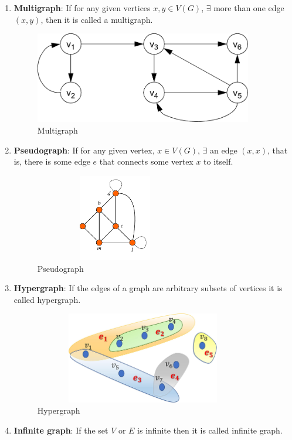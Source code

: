 \documentclass[../basic_graph_theory.tex]{subfiles}
\begin{document}
\begin{enumerate}
\begin{figure}[hbt!]
          \end{figure}
    \item \textbf{Multigraph}: If for any given vertices $x,y \in V(G)$, $\exists$ more than one edge $(x,y)$, then it is called a multigraph.
          \begin{figure}[hbt!]
              \centering
              \includegraphics[height=4cm, width=9.5cm]{../images/multi.png}
              \caption{Multigraph}
          \end{figure}
    \item \textbf{Pseudograph}: If for any given vertex, $x \in V(G)$, $\exists$ an edge $(x,x)$, that is, there is some edge $e$ that connects some vertex $x$ to itself.
          \begin{figure}[hbt!]
              \centering
              \includegraphics[height=3.82cm, width=7cm]{../images/pseudo.png}
              \caption{Pseudograph}
          \end{figure}
    \item \textbf{Hypergraph}: If the edges of a graph are arbitrary subsets of vertices it is called hypergraph.
          \begin{figure}[hbt!]
              \centering
              \includegraphics[height=4cm, width=9.5cm]{../images/hyper.jpg}
              \caption{Hypergraph}
          \end{figure}
    \item \textbf{Infinite graph}: If the set $V$ or $E$ is infinite then it is called infinite graph.
\end{enumerate}
\end{document}
